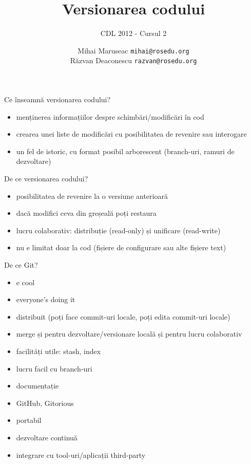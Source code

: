 \documentclass{beamer}
\title[]{Versionarea codului}
\subtitle{CDL 2012 - Cursul 2}
\institute[]{ROSEdu}
\author[]{
  Mihai Maruseac \texttt{mihai@rosedu.org} \\
  Răzvan Deaconescu \texttt{razvan@rosedu.org}
}
\begin{document}
\maketitle

\begin{frame}{Ce înseamnă versionarea codului?}
  \begin{itemize}
    \item menținerea informațiilor despre schimbări/modificări în cod
    \item crearea unei liste de modificări cu posibilitatea de revenire sau
      interogare
    \item un fel de istoric, cu format posibil arborescent (branch-uri,
      ramuri de dezvoltare)
  \end{itemize}
\end{frame}

\begin{frame}{De ce versionarea codului?}
  \begin{itemize}
    \item posibilitatea de revenire la o versiune anterioară
    \item dacă modifici ceva din greșeală poți restaura
    \item lucru colaborativ: distribuție (read-only) și unificare (read-write)
    \item nu e limitat doar la cod (fișiere de configurare sau alte fișiere text)
  \end{itemize}
\end{frame}

\begin{frame}{De ce Git?}
  \begin{itemize}
    \item e cool
    \item everyone's doing it
    \item distribuit (poți face commit-uri locale, poți edita commit-uri
      locale)
    \item merge și pentru dezvoltare/versionare locală și pentru lucru
      colaborativ
    \item facilități utile: stash, index
    \item lucru facil cu branch-uri
    \item documentație
    \item GitHub, Gitorious
    \item portabil
    \item dezvoltare continuă
    \item integrare cu tool-uri/aplicații third-party
  \end{itemize}
\end{frame}
\end{document}

